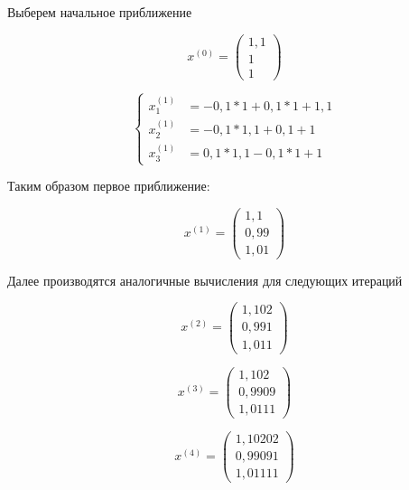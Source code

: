 Выберем начальное приближение

\begin{equation*}
	x^{(0)} =
	\begin{pmatrix}
		1,1\\
		1\\
		1
	\end{pmatrix}
\end{equation*}

\begin{equation*}
	\begin{cases}
		x_{1}^{(1)}&=-0,1*1+0,1*1+1,1\\
		x_{2}^{(1)}&=-0,1*1,1+0,1+1\\
		x_{3}^{(1)}&=0,1*1,1-0,1*1+1
	\end{cases}
\end{equation*}

Таким образом первое приближение:

\begin{equation*}
	x^{(1)} =
	\begin{pmatrix}
		1,1\\
		0,99\\
		1,01
	\end{pmatrix}
\end{equation*}

Далее производятся аналогичные вычисления для следующих итераций

\begin{equation*}
	x^{(2)} =
	\begin{pmatrix}
		1,102\\
		0,991\\
		1,011
	\end{pmatrix}
\end{equation*}

\begin{equation*}
	x^{(3)} =
	\begin{pmatrix}
		1,102\\
		0,9909\\
		1,0111
	\end{pmatrix}
\end{equation*}

\begin{equation*}
	x^{(4)} =
	\begin{pmatrix}
		1,10202\\
		0,99091\\
		1,01111
	\end{pmatrix}
\end{equation*}


